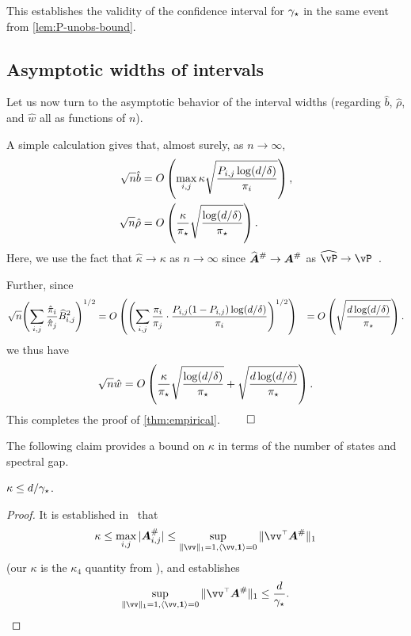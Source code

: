 This establishes the validity of the confidence interval for $\gamma_{\star}$ in
the same event from \cref{lem:P-unobs-bound}.

\subsection{Asymptotic widths of intervals}
\label{sec:asymptotic}

Let us now turn to the asymptotic behavior of the interval widths
(regarding $\hat{b}$, $\hat\rho$, and $\hat{w}$ all as
functions of $n$).

A simple calculation gives that, almost surely, as $n\to \infty$,
\begin{align*}
  \sqrt{n} \hat{b}
  & =
  O\left(
    \max_{i,j} \kappa \sqrt{\frac{P_{i,j} \log(d/\delta)}{\pi_i}}
  \right)
  ,
  \\
  \sqrt{n} \hat\rho
  & =
  O\left(
    \frac{\kappa}{\pi_{\star}} \sqrt{\frac{\log(d/\delta)}{\pi_{\star}}}
  \right)
  .
\end{align*}
Here, we use the fact that $\hat\kappa \to \kappa$ as $n\to\infty$
since $\giAh \to \giA$ as $\wh\vP \to
\vP$~\citep{li2001improvement,benitez2012continuity}.

Further, since
\begin{align*}
  \sqrt{n}
  \Biggl(
    \sum_{i,j} \frac{\hat{\pi}_i}{\hat{\pi}_j} \widehat{B}_{i,j}^2
  \Biggr)^{1/2}
  & =
  O\left(
    \Biggl(
      \sum_{i,j} \frac{{\pi}_i}{{\pi}_j}
      \cdot \frac{P_{i,j}(1-P_{i,j})\log(d/\delta)}{\pi_i}
    \Biggr)^{1/2}
  \right)
  & =
  O\left( \sqrt{ \frac{d\log(d/\delta)}{ \pi_{\star}}} \right)
  .
\end{align*}
we thus have
\begin{align*}
  \sqrt{n} \hat{w}
  =
  O\left( 
    \frac{\kappa}{\pi_{\star}} \sqrt{\frac{\log(d/\delta)}{\pi_{\star}}} + 
    \sqrt{ \frac{d\log(d/\delta)}{ \pi_{\star}}}
  \right)
  .
\end{align*}
This completes the proof of \cref{thm:empirical}.
\hfill $\qed$

The following claim provides a bound on $\kappa$ in terms of the
number of states and spectral gap.
\begin{claim}
  \label{claim:kappa-bound}
  $\kappa \leq d/\gamma_{\star}$.
\end{claim}
\begin{proof}
  It is established in~\citep{cho2001comparison} that
  \[
    \kappa
    \leq \max_{i,j} |\giA_{i,j}|
    \leq
    \sup_{\norm{\vv}_1 = 1 , \dotp{\vv,\v1} = 0} \norm{\vv^\t \giA}_1
  \]
  (our $\kappa$ is the $\kappa_4$ quantity from
  \citep{cho2001comparison}), and \citep{seneta1993sensitivity}
  establishes
  \[
    \sup_{\norm{\vv}_1 = 1 , \dotp{\vv,\v1} = 0} \norm{\vv^\t \giA}_1
    \leq
    \frac{d}{\gap}
    .
    \qedhere
  \]
\end{proof}

